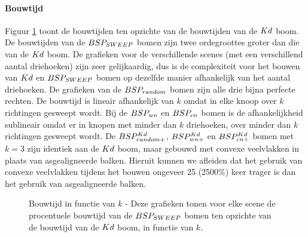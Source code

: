 \paragraph{Bouwtijd} Figuur \ref{fig:k-bouwtijd} toont de bouwtijden ten opzichte van de bouwtijden van de $Kd$ boom. De bouwtijden van de $BSP_{SWEEP}$ bomen zijn twee ordegroottes groter dan die van de $Kd$ boom. De grafieken voor de verschillende scenes (met een verschillend aantal driehoeken) zijn zeer gelijkaardig, dus is de complexiteit voor het bouwen van $Kd$ en $BSP_{SWEEP}$ bomen op dezelfde manier afhankelijk van het aantal driehoeken. De grafieken van de $BSP_{random}$ bomen zijn alle drie bijna perfecte rechten. De bouwtijd is lineair afhankelijk van $k$ omdat in elke knoop over $k$ richtingen gesweept wordt. Bij de $BSP_{wn}$ en $BSP_{cn}$ bomen is de afhankelijkheid sublineair omdat er in knopen met minder dan $k$ driehoeken, over minder dan $k$ richtingen gesweept wordt. 
De $BSP^{Kd}_{random+}$, $BSP^{Kd}_{wn+}$ en $BSP^{Kd}_{cn+}$ bomen met $k = 3$ zijn identiek aan de $Kd$ boom, maar gebouwd met convexe veelvlakken in plaats van asgealigneerde balken.
Hieruit kunnen we afleiden dat het gebruik van convexe veelvlakken tijdens het bouwen ongeveer 25 (2500\%) keer trager is dan het gebruik van asgealigneerde balken.
\begin{figure}[h]
  \centering
  \begin{subfigure}[t]{.32\linewidth}
    \centering
{}
  \end{subfigure}
  \begin{subfigure}[t]{.32\linewidth}
    \centering
{}
\end{subfigure}
\begin{subfigure}[t]{.32\linewidth}
  \centering
{}
\end{subfigure}
\caption[Bouwtijd in functie van $k$]{Bouwtijd in functie van $k$ - \small Deze grafieken tonen voor elke scene de procentuele bouwtijd van de $BSP_{SWEEP}$ bomen ten opzichte van de bouwtijd van de $Kd$ boom, in functie van $k$.}
\label{fig:k-bouwtijd}
\end{figure}


